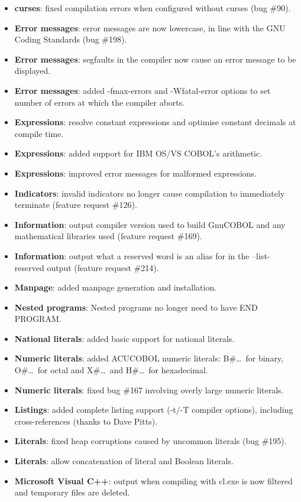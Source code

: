 \begin{itemize}
\item \textbf{curses}: fixed compilation errors when configured without curses (bug \#90).
\item \textbf{Error messages}: error messages are now lowercase, in line with the GNU Coding Standards (bug \#198).
\item \textbf{Error messages}: segfaults in the compiler now cause an error message to be displayed.
\item \textbf{Error messages}: added -fmax-errors and -Wfatal-error options to set number of errors at which the compiler aborts.
\item \textbf{Expressions}: resolve constant expressions and optimise constant decimals at compile time.
\item \textbf{Expressions}: added support for IBM OS/VS COBOL's arithmetic.
\item \textbf{Expressions}: improved error messages for malformed expressions.
\item \textbf{Indicators}: invalid indicators no longer cause compilation to immediately terminate (feature request \#126).
\item \textbf{Information}: output compiler version used to build GnuCOBOL and any mathematical libraries used (feature request \#169).
\item \textbf{Information}: output what a reserved word is an alias for in the --list-reserved output (feature request \#214).
\item \textbf{Manpage}: added manpage generation and installation.
\item \textbf{Nested programs}: Nested programs no longer need to have END PROGRAM.
\item \textbf{National literals}: added basic support for national literals.
\item \textbf{Numeric literals}: added ACUCOBOL numeric literals: B\#\ldots\, for binary, O\#\ldots\, for octal and X\#\ldots\, and H\#\ldots\, for hexadecimal.
\item \textbf{Numeric literals}: fixed bug \#167 involving overly large numeric literals.
\item \textbf{Listings}: added complete listing support (-t\slash{}-T compiler options), including cross-references (thanks to Dave Pitts).
\item \textbf{Literals}: fixed heap corruptions caused by uncommon literals (bug \#195).
\item \textbf{Literals}: allow concatenation of literal and Boolean literals.
\item \textbf{Microsoft Visual C++}: output when compiling with cl.exe is now filtered and temporary files are deleted.

\end{itemize}
